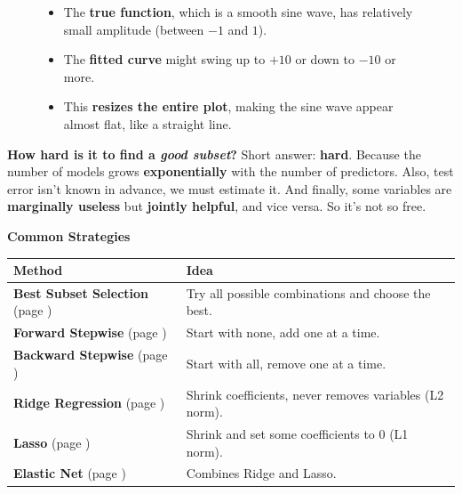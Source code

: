 \begin{figure}[!htp]
{\begin{itemize}
        \begin{itemize}
            \item The \textbf{true function}, which is a smooth sine wave, has relatively small amplitude (between $-1$ and $1$).
            \item The \textbf{fitted curve} might swing up to $+10$ or down to $-10$ or more.
            \item This \textbf{resizes the entire plot}, making the sine wave appear almost flat, like a straight line.
        \end{itemize}
    \end{itemize}}
\end{figure}

\highspace
\textcolor{Red2}{ \textbf{How hard is it to find a \emph{good subset}?}} Short answer: \textbf{hard}. Because the number of models grows \textbf{exponentially} with the number of predictors. Also, test error isn't known in advance, we must estimate it. And finally, some variables are \textbf{marginally useless} but \textbf{jointly helpful}, and vice versa. So it's not so free.

\highspace
\begin{flushleft}
    \textcolor{Green3}{ \textbf{Common Strategies}}
\end{flushleft}
\begin{table}[!htp]
    \centering
    \begin{adjustbox}{width={\textwidth},totalheight={\textheight},keepaspectratio}
        \begin{tabular}{@{} l l @{}}
            \toprule
            Method & Idea \\
            \midrule
            \textbf{Best Subset Selection} (page \pageref{subsubsection: Best Subset Selection})    & Try all possible combinations and choose the best.           \\ [.3em]
            \textbf{Forward Stepwise} (page \pageref{subsubsection: Forward Stepwise})              & Start with none, add one at a time.                        \\ [.3em]
            \textbf{Backward Stepwise} (page \pageref{subsubsection: Backward Stepwise})            & Start with all, remove one at a time.                      \\ [.3em]
            \textbf{Ridge Regression} (page \pageref{paragraph: Ridge Regression})                  & Shrink coefficients, never removes variables (L2 norm).    \\ [.3em]
            \textbf{Lasso} (page \pageref{paragraph: Lasso})                                        & Shrink and set some coefficients to 0 (L1 norm).       \\ [.3em]
            \textbf{Elastic Net} (page \pageref{paragraph: Elastic Net})                            & Combines Ridge and Lasso.                                    \\
            \bottomrule
        \end{tabular}
    \end{adjustbox}
\end{table}
